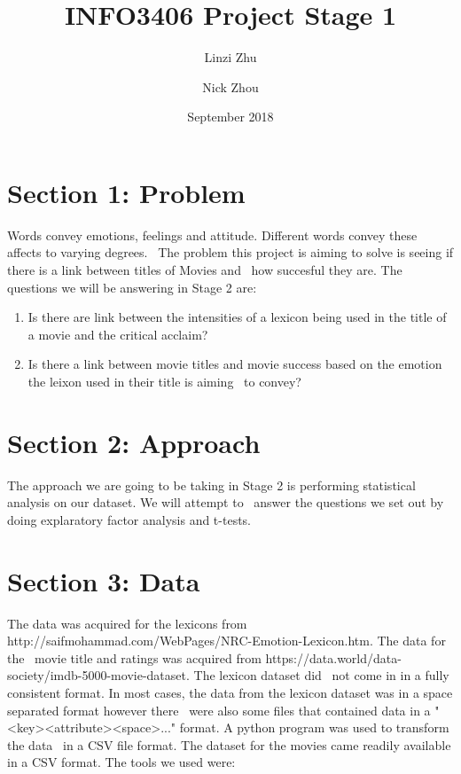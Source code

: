 \documentclass[12pt,a4paper]{article}
\begin{document}
\begin{titlepage}
    \title{INFO3406 Project Stage 1}
    \author{Linzi Zhu\\
            \and
            Nick Zhou
    }
    \date{September 2018}
    \maketitle
\end{titlepage}

    \pagebreak
    \tableofcontents
    \pagebreak

    \section{Section 1: Problem}
    Words convey emotions, feelings and attitude. Different words convey these affects to varying degrees. \
    The problem this project is aiming to solve is seeing if there is a link between titles of Movies and \
    how succesful they are.
    \newline \newline
    The questions we will be answering in Stage 2 are:

    \begin{enumerate}
        \item Is there are link between the intensities of a lexicon being used in the title of a movie and the critical acclaim?
        \item Is there a link between movie titles and movie success based on the emotion the leixon used in their title is aiming \
        to convey?

    \end{enumerate}

    \section{Section 2: Approach}
    The approach we are going to be taking in Stage 2 is performing statistical analysis on our dataset. We will attempt to \
    answer the questions we set out by doing explaratory factor analysis and t-tests.

    \section{Section 3: Data}

    The data was acquired for the lexicons from http://saifmohammad.com/WebPages/NRC-Emotion-Lexicon.htm. The data for the \
    movie title and ratings was acquired from https://data.world/data-society/imdb-5000-movie-dataset. The lexicon dataset did \
    not come in in a fully consistent format. In most cases, the data from the lexicon dataset was in a space separated format however there \
    were also some files that contained data in a "<key><attribute><space>..." format. A python program was used to transform the data \
    in a CSV file format. The dataset for the movies came readily available in a CSV format.
    \newline \newline
    The tools we used were:
\end{document}
